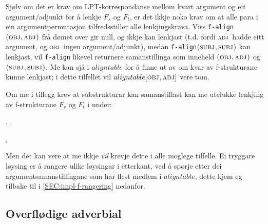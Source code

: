 \documentclass[11pt,a4paper,oneside,draft]{book}
\newcommand{\F}[2]{\textsc{#1}\ensuremath{_{#2}}}
\newcommand{\OBJ}{\F{obj}{}}
\newcommand{\OBJs}{\F{obj~}{}}
\newcommand{\ADJ}{\F{adj}{}}
\newcommand{\ADJs}{\F{adj~}{}}
\newcommand{\SUBJ}{\F{subj}{}}
\begin{document}
Sjølv om det er krav om LPT-korrespondanse mellom kvart argument og
eit argument/adjunkt for å lenkje $F_s$ og $F_t$, er det ikkje noko
krav om at alle para i ein argumentpermutasjon tilfredsstiller alle
lenkjingskrava. Viss \texttt{f-align}$(\OBJ,\ADJ)$ frå dømet over gir
null, og ikkje kan lenkjast (t.d. fordi \ADJs hadde eitt argument, og
\OBJs ingen argument/adjunkt), medan \texttt{f-align}$(\SUBJ,\SUBJ)$
kan lenkjast, vil \texttt{f-align} likevel returnere samanstillinga som
inneheld $(\OBJ,\ADJ)$ og $(\SUBJ,\SUBJ)$. Me kan sjå i $aligntable$
for å finne ut av om kvar av f-strukturane kunne lenkjast; i dette
tilfellet vil $aligntable[\OBJ,\ADJ]$ vere tom.


Om me i tillegg krev at substrukturar kan samanstillast kan me
utelukke lenkjing av f-strukturane $F_s$ og $F_t$ i \Next under:

{\avmoptions{}

\ex. \a.  \begin{avm}    \end{avm}
  \b.\begin{avm}  \end{avm}

}

Men det kan vere at me ikkje \emph{vil} krevje dette i alle moglege
tilfelle. Ei tryggare løysing er å rangere ulike løysingar i
etterkant, ved å spørje etter dei argumentsamanstillingane som har
flest medlem i $aligntable$, dette kjem eg tilbake til i
\ref{SEC:impl-f-rangering} nedanfor.
\subsection{Overflødige adverbial}
\label{sec-4.1.1}

   \label{SEC:impl-adjalign}
\end{document}

